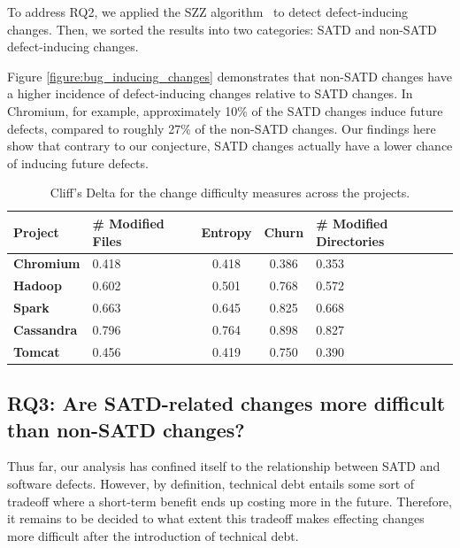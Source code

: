 To address RQ2, we applied the SZZ algorithm~\cite{sliwerski-msr-2005} to detect defect-inducing changes. Then, we sorted the results into two categories: SATD and non-SATD defect-inducing changes.




Figure \ref{figure:bug_inducing_changes} demonstrates that non-SATD changes have a higher incidence of defect-inducing changes relative to SATD changes.  In Chromium, for example, approximately 10\% of the SATD changes induce future defects, compared to roughly 27\% of the non-SATD changes. Our findings here show that contrary to our conjecture, SATD changes actually have a lower chance of inducing future defects.




\begin{table}[tb!]
	\setlength{\tabcolsep}{.7\tabcolsep}
	\centering
	\caption{Cliff's Delta for the change difficulty measures across the projects.}
	\begin{tabular}{l|C{1.5in}|c|c|C{2in}}
		\hline
		\textbf{Project}   & {\bf \# Modified Files}    & {\bf Entropy} & {\bf Churn} & {\bf\# Modified Directories}    \\ \hline
		\textbf{Chromium}  & 0.418 & 0.418   & 0.386 & 0.353 \\ \hline
		\textbf{Hadoop}    & 0.602 & 0.501   & 0.768 & 0.572 \\ \hline
		\textbf{Spark}     & 0.663 & 0.645   & 0.825 & 0.668 \\ \hline
		\textbf{Cassandra} & 0.796 & 0.764   & 0.898 & 0.827 \\ \hline
		\textbf{Tomcat}    & 0.456 & 0.419   & 0.750 & 0.390 \\ \hline
	\end{tabular}
	\label{table:cliff_deltas_RQ3}
\end{table}

\subsection*{RQ3: Are SATD-related changes more difficult than non-SATD changes?}

 Thus far, our analysis has confined itself to the relationship between SATD and software defects. However, by definition, technical debt entails some sort of tradeoff where a short-term benefit ends up costing more in the future. Therefore, it remains to be decided to what extent this tradeoff makes effecting changes more difficult after the introduction of technical debt.

